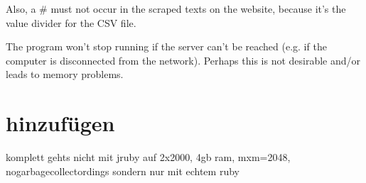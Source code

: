 \documentclass{scrartcl}
\begin{document}
Also, a \# must not occur in the scraped texts on the website, because it's the value divider for the CSV file.

The program won't stop running if the server can't be reached (e.g. if the computer is disconnected from the network). Perhaps this is not desirable and/or leads to memory problems.

\section{hinzufügen}
komplett gehts nicht mit jruby auf 2x2000, 4gb ram, mxm=2048, nogarbagecollectordings
sondern nur mit echtem ruby
\end{document}
